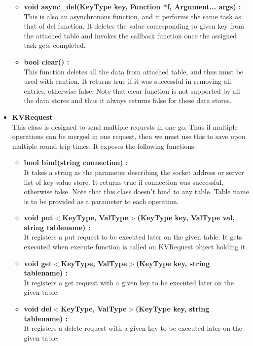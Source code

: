 \documentclass[11pt]{article}
\begin{document}
\begin{itemize}
\begin{itemize}
\item \textbf{void async\_del(KeyType key, Function *f, Argument... args) :}\\
This is also an asynchronous function, and it performs the same task as that of del function. It deletes the value corresponding to given key from the attached table and invokes the callback function once the assigned task gets completed.\\

\item \textbf{bool clear() :}\\
This function deletes all the data from attached table, and thus must be used with caution. It returns true if it was successful in removing all entries, otherwise false. Note that clear function is not supported by all the data stores and thus it always returns false for these data stores.
\end{itemize}


\item \textbf{KVRequest} \\
This class is designed to send multiple requests in one go. Thus if multiple operations can be merged in one request, then we must use this to save upon multiple round trip times. It exposes the following functions:
\begin{itemize}
\item \textbf{bool bind(string connection) :}\\
It takes a string as the parameter describing the socket address or server list of key-value store. It returns true if connection was successful, otherwise false. Note that this class doesn't bind to any table. Table name is to be provided as a parameter to each operation.\\

\item \textbf{void put$<$KeyType, ValType$>$(KeyType key, ValType val, string tablename) :}\\
It registers a put request to be executed later on the given table. It gets executed when execute function is called on KVRequest object holding it.\\

\item \textbf{void get$<$KeyType, ValType$>$(KeyType key, string tablename) :}\\
It registers a get request with a given key to be executed later on the given table.\\

\item \textbf{void del$<$KeyType, ValType$>$(KeyType key, string tablename) :}\\
It registers a delete request with a given key to be executed later on the given table.\\


\end{itemize}
\end{itemize}
\end{document}
